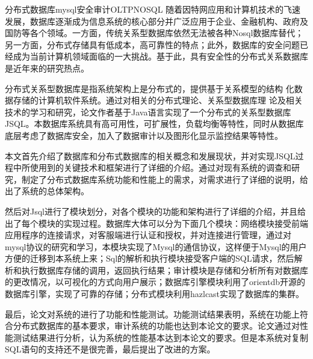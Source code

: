 
\begin{Cabstract}{分布式数据库}{mysql}{安全审计}{OLTP}{NOSQL}
随着因特网应用和计算机技术的飞速发展，数据库逐渐成为信息系统的核心部分并广泛应用于企业、金融机构、政府及国防等各个领域。一方面，传统关系型数据库依然无法被各种Nosql数据库替代；另一方面，分布式存储具有低成本，高可靠性的特点；此外，数据库的安全问题已经成为当前计算机领域面临的一大挑战。基于此，具有安全性的分布式关系数据库是近年来的研究热点。

分布式关系型数据库是指系统架构上是分布式的，提供基于关系模型的结构
化数据存储的计算机软件系统。通过对相关的分布式理论、关系型数据库理
论及相关技术的学习和研究，论文作者基于Java语言实现了一个分布式的关系型数据库JSQL。本数据库系统具有高可用性，可扩展性，负载均衡等特性，同时从数据库底层考虑了数据库安全，加入了数据审计以及图形化显示监控结果等特性。

本文首先介绍了数据库和分布式数据库的相关概念和发展现状，并对实现JSQL过程中所使用到的关键技术和框架进行了详细的介绍。通过对现有系统的调查和研究，制定了分布式数据库系统功能和性能上的需求，对需求进行了详细的说明，给出了系统的总体架构。

然后对Jsql进行了模块划分，对各个模块的功能和架构进行了详细的介绍，并且给出了每个模块的实现过程。数据库大体可以分为下面几个模块：网络模块接受前端应用程序的连接请求，对客服端进行认证和授权，并对连接进行管理，通过对mysql协议的研究和学习，本模块实现了Mysql的通信协议，这样便于Mysql的用户方便的迁移到本系统上来；Sql的解析和执行模块接受客户端的SQL请求，然后解析和执行数据库存储的调用，返回执行结果；审计模块是存储和分析所有对数据库的更改情况，以可视化的方式向用户展示；数据库引擎模块利用了orientdb开源的数据库引擎，实现了可靠的存储；分布式模块利用hazlcast实现了数据库的集群。

最后，论文对系统的进行了功能和性能测试。功能测试结果表明，系统在功能上符合分布式数据库的基本要求，审计系统的功能也达到本论文的要求。论文通过对性能测试结果进行分析，认为系统的性能基本达到本论文的要求。但是本系统对复制SQL语句的支持还不是很完善，最后提出了改进的方案。
\end{Cabstract}